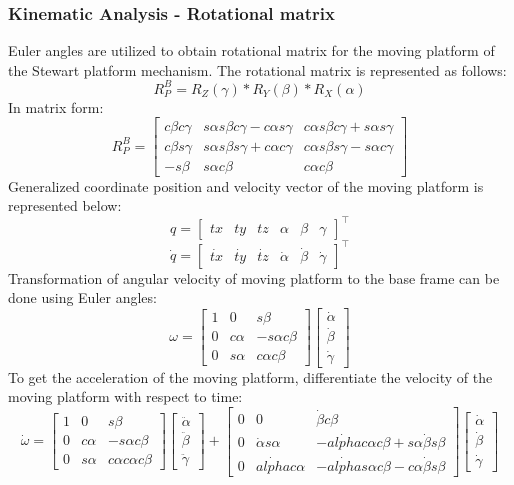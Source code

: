 \subsubsection{Kinematic Analysis - Rotational matrix}
Euler angles are utilized to obtain rotational matrix for the moving platform of the Stewart platform mechanism. The rotational matrix is represented as follows:
\begin{equation}
 R_{P}^B = R_{Z}(\gamma)*R_{Y}(\beta)*R_{X}(\alpha)
\end{equation}
In matrix form:
\[ R_{P}^B =
 \begin{bmatrix}
 c\beta c\gamma & s\alpha s\beta c\gamma - c\alpha s\gamma & c\alpha s\beta c\gamma + s\alpha s\gamma\\
 c\beta s\gamma & s\alpha s\beta s\gamma + c\alpha c\gamma & c\alpha s\beta s\gamma - s\alpha c\gamma\\
 -s\beta & s\alpha c\beta & c\alpha c\beta  
 \end{bmatrix}
\]
Generalized coordinate position and velocity vector of the moving platform is represented below:
\[
q=
\begin{bmatrix}
tx & ty & tz & \alpha & \beta & \gamma
\end{bmatrix}^\top
\]
\[
\dot{q}=
\begin{bmatrix}
\dot{tx} & \dot{ty} & \dot{tz} & \dot{\alpha} & \dot{\beta} & \dot{\gamma}
\end{bmatrix}^\top
\]
Transformation of angular velocity of moving platform to the base frame can be done using Euler angles:
\[
\omega =
\begin{bmatrix}
1 & 0 & s\beta \\
0 & c\alpha & -s\alpha c\beta \\
0 & s\alpha & c\alpha c\beta 
\end{bmatrix}
\begin{bmatrix}
\dot{\alpha} \\
\dot{\beta}\\
\dot{\gamma}
\end{bmatrix}
\]
To get the acceleration of the moving platform, differentiate the velocity of the moving platform with respect to time:
\[
\dot{\omega} =
\begin{bmatrix}
1 & 0 & s\beta \\
0 & c\alpha & -s\alpha c\beta \\
0 & s\alpha & c\alpha c\alpha c\beta 
\end{bmatrix}
\begin{bmatrix}
\ddot{\alpha} \\
\ddot{\beta}\\
\ddot{\gamma}
\end{bmatrix}
+
\begin{bmatrix}
0 & 0 & \dot{\beta}c\beta \\
0 & \dot{\alpha}s\alpha & -\dot{alpha}c\alpha c\beta + s\alpha \dot{\beta}s\beta \\
0 & \dot{alpha}c\alpha & -\dot{alpha}s\alpha c\beta - c\alpha \dot{\beta}s\beta
\end{bmatrix}
\begin{bmatrix}
\dot{\alpha} \\
\dot{\beta}\\
\dot{\gamma}
\end{bmatrix}
\]
